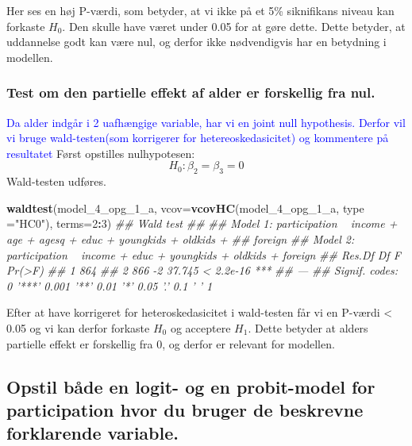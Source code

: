 \documentclass[
  10pt,
]{article}
\newenvironment{Shaded}{\begin{snugshade}}{\end{snugshade}}
\newcommand{\CommentTok}[1]{\textcolor[rgb]{0.56,0.35,0.01}{\textit{#1}}}
\newcommand{\DataTypeTok}[1]{\textcolor[rgb]{0.13,0.29,0.53}{#1}}
\newcommand{\DecValTok}[1]{\textcolor[rgb]{0.00,0.00,0.81}{#1}}
\newcommand{\KeywordTok}[1]{\textcolor[rgb]{0.13,0.29,0.53}{\textbf{#1}}}
\newcommand{\NormalTok}[1]{#1}
\newcommand{\OperatorTok}[1]{\textcolor[rgb]{0.81,0.36,0.00}{\textbf{#1}}}
\newcommand{\StringTok}[1]{\textcolor[rgb]{0.31,0.60,0.02}{#1}}
\begin{document}
Her ses en høj P-værdi, som betyder, at vi ikke på et 5\% siknifikans
niveau kan forkaste \(H_0\). Den skulle have været under 0.05 for at
gøre dette. Dette betyder, at uddannelse godt kan være nul, og derfor
ikke nødvendigvis har en betydning i modellen.

\hypertarget{test-om-den-partielle-effekt-af-alder-er-forskellig-fra-nul.}{%
\subsubsection{Test om den partielle effekt af alder er forskellig fra
nul.}\label{test-om-den-partielle-effekt-af-alder-er-forskellig-fra-nul.}}

\textcolor{blue}{Da alder indgår i 2 uafhængige variable, har vi en joint null hypothesis. Derfor vil vi bruge wald-testen(som korrigerer for hetereoskedasicitet) og kommentere på resultatet}
Først opstilles nulhypotesen: \[H_0:\beta_2=\beta_3=0\] Wald-testen
udføres.

\begin{Shaded}
\begin{Highlighting}[]
\KeywordTok{waldtest}\NormalTok{(model_}\DecValTok{4}\NormalTok{_opg_}\DecValTok{1}\NormalTok{_a, }\DataTypeTok{vcov=}\KeywordTok{vcovHC}\NormalTok{(model_}\DecValTok{4}\NormalTok{_opg_}\DecValTok{1}\NormalTok{_a, }\DataTypeTok{type =}\StringTok{"HC0"}\NormalTok{), }\DataTypeTok{terms=}\DecValTok{2}\OperatorTok{:}\DecValTok{3}\NormalTok{)}
\CommentTok{## Wald test}
\CommentTok{## }
\CommentTok{## Model 1: participation ~ income + age + agesq + educ + youngkids + oldkids + }
\CommentTok{##     foreign}
\CommentTok{## Model 2: participation ~ income + educ + youngkids + oldkids + foreign}
\CommentTok{##   Res.Df Df      F    Pr(>F)    }
\CommentTok{## 1    864                        }
\CommentTok{## 2    866 -2 37.745 < 2.2e-16 ***}
\CommentTok{## ---}
\CommentTok{## Signif. codes:  0 '***' 0.001 '**' 0.01 '*' 0.05 '.' 0.1 ' ' 1}
\end{Highlighting}
\end{Shaded}

Efter at have korrigeret for heteroskedasicitet i wald-testen får vi en
P-værdi \textless{} 0.05 og vi kan derfor forkaste \(H_0\) og acceptere
\(H_1\). Dette betyder at alders partielle effekt er forskellig fra 0,
og derfor er relevant for modellen.

\hypertarget{opstil-buxe5de-en-logit--og-en-probit-model-for-participation-hvor-du-bruger-de-beskrevne-forklarende-variable.}{%
\subsection{Opstil både en logit- og en probit-model for participation
hvor du bruger de beskrevne forklarende
variable.}\label{opstil-buxe5de-en-logit--og-en-probit-model-for-participation-hvor-du-bruger-de-beskrevne-forklarende-variable.}}
\end{document}
